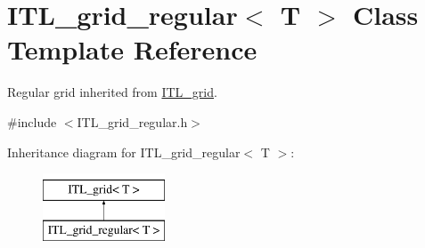 \hypertarget{classITL__grid__regular}{
\section{ITL\_\-grid\_\-regular$<$ T $>$ Class Template Reference}
\label{classITL__grid__regular}
}


Regular grid inherited from \hyperlink{classITL__grid}{ITL\_\-grid}.  




{\ttfamily \#include $<$ITL\_\-grid\_\-regular.h$>$}

Inheritance diagram for ITL\_\-grid\_\-regular$<$ T $>$:\begin{figure}[H]
\begin{center}
\leavevmode
\includegraphics[height=2cm]{classITL__grid__regular}
\end{center}
\end{figure}
